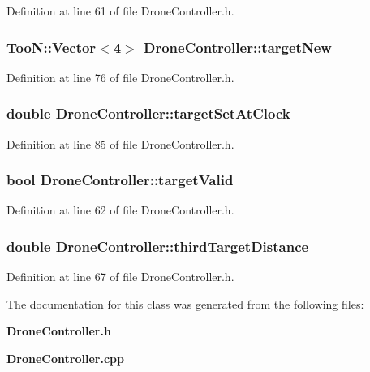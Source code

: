 Definition at line 61 of file Drone\-Controller.\-h.

\subsubsection[{target\-New}]{\setlength{\rightskip}{0pt plus 5cm}Too\-N\-::\-Vector$<$4$>$ Drone\-Controller\-::target\-New\hspace{0.3cm}{\ttfamily [private]}}\label{classDroneController_a137a8270654cc9b7e280f237ddd14731}


Definition at line 76 of file Drone\-Controller.\-h.

\subsubsection[{target\-Set\-At\-Clock}]{\setlength{\rightskip}{0pt plus 5cm}double Drone\-Controller\-::target\-Set\-At\-Clock\hspace{0.3cm}{\ttfamily [private]}}\label{classDroneController_a5b2dac7ef8936abc7aed98697879db23}


Definition at line 85 of file Drone\-Controller.\-h.

\subsubsection[{target\-Valid}]{\setlength{\rightskip}{0pt plus 5cm}bool Drone\-Controller\-::target\-Valid\hspace{0.3cm}{\ttfamily [private]}}\label{classDroneController_af899315cbafbe2592df555e6a46db969}


Definition at line 62 of file Drone\-Controller.\-h.

\subsubsection[{third\-Target\-Distance}]{\setlength{\rightskip}{0pt plus 5cm}double Drone\-Controller\-::third\-Target\-Distance\hspace{0.3cm}{\ttfamily [private]}}\label{classDroneController_a2e31247cdb0c292bb377e6e017ebc898}


Definition at line 67 of file Drone\-Controller.\-h.



The documentation for this class was generated from the following files\-:\begin{DoxyCompactItemize}
\item 
{\bf Drone\-Controller.\-h}\item 
{\bf Drone\-Controller.\-cpp}\end{DoxyCompactItemize}
